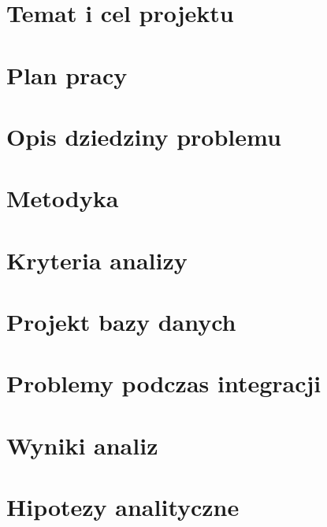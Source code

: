 \documentclass[12pt]{aghdpl}
\author{Łukasz Opioła, Beata Skiba}
\date{2015}
\begin{document}
\titlepages

\tableofcontents

\chapter{Temat i cel projektu}
\label{chap:cel}


\chapter{Plan pracy}
\label{chap:plan}


\chapter{Opis dziedziny problemu}
\label{chap:analiza-zrodel}


\chapter{Metodyka}
\label{chap:metodyka}


\chapter{Kryteria analizy}
\label{chap:kryteria}


\chapter{Projekt bazy danych}
\label{chap:projekt-bazy}


\chapter{Problemy podczas integracji}
\label{chap:problemy}


\chapter{Wyniki analiz}
\label{chap:wyniki-analiz}


\chapter{Hipotezy analityczne}
\label{chap:hipotezy}

\end{document}
